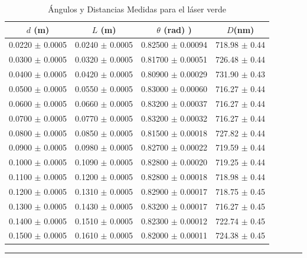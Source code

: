 \documentclass[10pt,a4paper]{article}
\begin{document}
	\begin{table}[H]
		\centering
		\begin{tabular}{|c|c|c|c|}
			\hline
			$d$ (m) & $L$ (m) & $\theta$ (rad) )&  $D$(nm) \\ \hline
			0.0220 $\pm$ 0.0005  & 0.0240 $\pm$ 0.0005 &  0.82500 $\pm$ 0.00094 & 718.98 $\pm$ 0.44 \\
			0.0300 $\pm$ 0.0005  & 0.0320 $\pm$ 0.0005 &  0.81700 $\pm$ 0.00051 & 726.48 $\pm$ 0.44 \\
			0.0400 $\pm$ 0.0005  & 0.0420 $\pm$ 0.0005 &  0.80900 $\pm$ 0.00029 & 731.90 $\pm$ 0.43 \\ 
			0.0500 $\pm$ 0.0005 & 0.0550 $\pm$ 0.0005 & 0.83000 $\pm$ 0.00060 & 716.27 $\pm$ 0.44 \\ 
			0.0600 $\pm$ 0.0005 & 0.0660 $\pm$ 0.0005 & 0.83200 $\pm$ 0.00037 &  716.27  $\pm$ 0.44 \\ 
			0.0700 $\pm$ 0.0005 & 0.0770 $\pm$ 0.0005 & 0.83200 $\pm$ 0.00032 & 716.27 $\pm$ 0.44  \\
			0.0800 $\pm$ 0.0005  & 0.0850 $\pm$ 0.0005 &  0.81500 $\pm$ 0.00018 & 727.82 $\pm$ 0.44  \\ 
			0.0900 $\pm$ 0.0005 & 0.0980 $\pm$ 0.0005 &  0.82700 $\pm$ 0.00022 & 719.59 $\pm$ 0.44  \\
			0.1000 $\pm$ 0.0005 & 0.1090 $\pm$ 0.0005 &  0.82800 $\pm$ 0.00020 & 719.25 $\pm$ 0.44   \\
			0.1100 $\pm$ 0.0005 & 0.1200 $\pm$ 0.0005 &  0.82800 $\pm$ 0.00018 & 718.98 $\pm$ 0.44  \\
			0.1200 $\pm$ 0.0005 & 0.1310 $\pm$ 0.0005 &  0.82900 $\pm$ 0.00017 & 718.75 $\pm$ 0.45   \\
			0.1300 $\pm$ 0.0005 & 0.1430 $\pm$ 0.0005 &  0.83200 $\pm$ 0.00017 & 716.27 $\pm$ 0.45  \\
			0.1400 $\pm$ 0.0005 & 0.1510 $\pm$ 0.0005 &  0.82300 $\pm$ 0.00012 & 722.74 $\pm$ 0.45   \\
			0.1500 $\pm$ 0.0005 & 0.1610 $\pm$ 0.0005 &  0.82000 $\pm$ 0.00011 & 724.38 $\pm$ 0.45   \\ \hline
			
		\end{tabular}
		\caption{Ángulos y Distancias Medidas para el láser verde}
		\label{tab:angulos_distancias 2.}
		\rule{100mm}{0.1mm}
	\end{table}
\newpage
\end{document}
